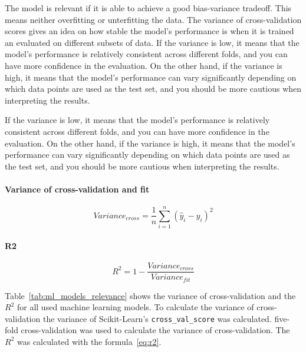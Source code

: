 
The model is relevant if it is able to achieve a good bias-variance tradeoff. This means neither overfitting or unterfitting the data.
The variance of cross-validation scores gives an idea on how stable the model's performance is when it is trained an evaluated on different subsets of data.
If the variance is low, it means that the model's performance is relatively consistent across different folds, and you can have more confidence in the evaluation. On the other hand, if the variance is high, it means that the model's performance can vary significantly depending on which data points are used as the test set, and you should be more cautious when interpreting the results.

If the variance is low, it means that the model's performance is relatively consistent across different folds, and you can have more confidence in the evaluation. On the other hand, if the variance is high, it means that the model's performance can vary significantly depending on which data points are used as the test set, and you should be more cautious when interpreting the results.

\paragraph*{Variance of cross-validation and fit}

\begin{equation}
    \label{eq:variance_cross}
    Variance_{cross} = \frac{1}{n} \sum_{i=1}^{n} (\hat{y}_i - y_i)^2
\end{equation}

\paragraph*{R2}

\begin{equation}
    \label{eq:r2}
    R^2 = 1 - \frac{Variance_{cross}}{Variance_{fit}}
\end{equation}

Table~\ref*{tab:ml_models_relevance} shows the variance of cross-validation and the $R^2$ for all used machine learning models.
To calculate the variance of cross-validation  the variance of Scikit-Learn's \texttt{cross\_val\_score} was calculated. five-fold cross-validation was used to calculate the variance of cross-validation. The $R^2$ was calculated with the formula~\ref{eq:r2}. 


